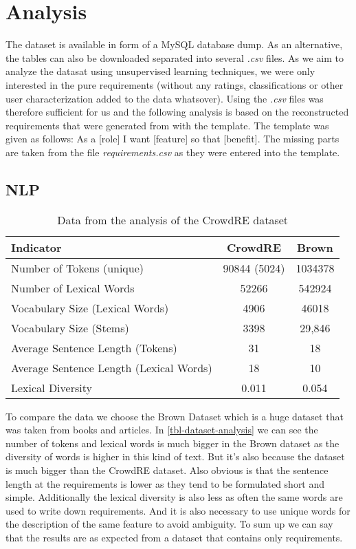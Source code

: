 \section{Analysis}
The \crowdre{} dataset is available in form of a MySQL database dump. As an alternative, the tables can also be downloaded separated into several \textit{.csv} files. As we aim to analyze the datasat using unsupervised learning techniques, we were only interested in the pure requirements (without any ratings, classifications or other user characterization added to the data whatsover). Using the \textit{.csv} files was therefore sufficient for us and the following analysis is based on the reconstructed requirements that were generated from with the template. The template was given as follows: As a [role] I want [feature] so that [benefit]. The missing parts are taken from the file \textit{requirements.csv} as they were entered into the template.

\subsection{NLP}
\begin{table}[bht]
\centering
\begin{tabular}{ | l | c | c | }
\hline
Indicator & CrowdRE & Brown \\ \hline
Number of Tokens (unique) & 90844 (5024) & 1034378 \\ \hline
Number of Lexical Words & 52266 & 542924 \\ \hline
Vocabulary Size (Lexical Words) & 4906 & 46018 \\ \hline
Vocabulary Size (Stems) & 3398 & 29,846 \\ \hline
Average Sentence Length (Tokens) & 31 & 18 \\ \hline
Average Sentence Length (Lexical Words) & 18 & 10 \\ \hline
Lexical Diversity & 0.011 & 0.054 \\ \hline
\end{tabular}
\caption{Data from the analysis of the CrowdRE dataset}\label{tbl-dataset-analysis}
\end{table}

To compare the data we choose the Brown Dataset which is a huge dataset that was taken from books and articles. In \autoref{tbl-dataset-analysis} we can see the number of tokens and lexical words is much bigger in the Brown dataset as the diversity of words is higher in this kind of text. But it's also because the dataset is much bigger than the CrowdRE dataset. Also obvious is that the sentence length at the requirements is lower as they tend to be formulated short and simple. Additionally the lexical diversity is also less as often the same words are used to write down requirements. And it is also necessary to use unique words for the description of the same feature to avoid ambiguity. To sum up we can say that the results are as expected from a dataset that contains only requirements.

